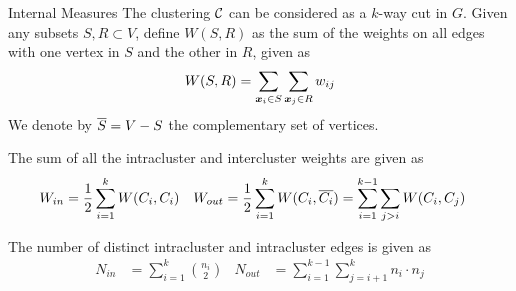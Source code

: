 \begin{frame}{Internal Measures}
The clustering ${\mathcal C}$ can be considered as a
$k$-way cut in $G$.
Given any subsets $S,R \subset V$, def\/{i}ne $W(S,R)$ as the sum of the
weights on all edges with one vertex in $S$ and the other in $R$, given
as
\begin{align*}
  W(S, R) = \sum_{{\boldsymbol x}_i \in S} \sum_{{\boldsymbol x}_{j} \in R} w_{ij}
\end{align*}
We denote by $\overline{S} = V - S$ the complementary set
of vertices.

\medskip
The sum of all the intracluster and intercluster 
weights are given as
\begin{align*}
  W_{in} & = \frac{1}{2} \sum_{i=1}^k W(C_i,C_i) &
  W_{out} & = \frac{1}{2} \sum_{i=1}^k W(C_i, \overline{C_i})
  = \sum_{i=1}^{k-1} \sum_{j > i} W(C_i, C_{j})
\end{align*}

The number of distinct intracluster and intracluster edges is given as
\begin{align*}
  N_{in} &= \sum_{i=1}^k {n_i \choose 2} & 
  N_{out} &= \sum_{i=1}^{k-1} \sum_{j=i+1}^k n_i \cdot n_{j} 
\end{align*}
\end{frame}



